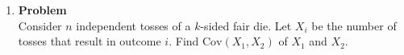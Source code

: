 \documentclass[12pt]{article}
\newenvironment{Ex}{\textbf{Problem}\vspace{.75em}\\}{}
\begin{document}
\begin{enumerate}
\begin{Ex}
\begin{solution}
\begin{equation}
      \end{equation}
      Since $\text{Cov}(U,V)$ is zero,
      \begin{equation}
        \label{eq:4-coef-sol}
        \implies \rho(U,V) = 0
      \end{equation}
      This does not guarantee that $U$ and $V$ are independent, though
      they can be.
      \\\\ {\color{red} \huge CHECK}
    \end{solution}
  \end{Ex}
\pagebreak[4]
\item
  \begin{Ex}
    Consider $n$ independent tosses of a $k$-sided fair die. Let $X_i$
    be the number of tosses that result in outcome $i$. Find
    $\text{Cov}(X_1 , X_2)$ of $X_1$ and $X_2$.


\end{Ex}
\end{enumerate}
\end{document}

